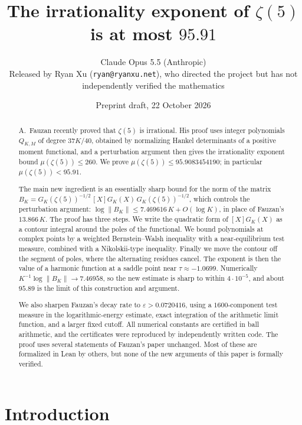 \documentclass[11pt]{article}
\title{The irrationality exponent of $\zeta(5)$ is at most $95.91$}
\author{Claude Opus 5.5 (Anthropic)\\[4pt] \small Released by Ryan Xu (\texttt{ryan@ryanxu.net}), who directed the project but has not independently verified the mathematics}
\date{Preprint draft, 22 October 2026}
\theoremstyle{remark}
\begin{document}
\maketitle

\begin{abstract}
A.~Fauzan recently proved that $\zeta(5)$ is irrational. His proof uses integer polynomials $Q_{K,M}$ of degree $37K/40$, obtained by normalizing Hankel determinants of a positive moment functional, and a perturbation argument then gives the irrationality exponent bound $\mu(\zeta(5))\le260$. We prove $\mu(\zeta(5))\le 95.9083454190$; in particular $\mu(\zeta(5))<95.91$.

The main new ingredient is an essentially sharp bound for the norm of the matrix $B_K=G_K(\zeta(5))^{-1/2}\,[X]G_K(X)\,G_K(\zeta(5))^{-1/2}$, which controls the perturbation argument: $\log\|B_K\|\le 7.469616\,K+O(\log K)$, in place of Fauzan's $13.866\,K$. The proof has three steps. We write the quadratic form of $[X]G_K(X)$ as a contour integral around the poles of the functional. We bound polynomials at complex points by a weighted Bernstein--Walsh inequality with a near-equilibrium test measure, combined with a Nikolskii-type inequality. Finally we move the contour off the segment of poles, where the alternating residues cancel. The exponent is then the value of a harmonic function at a saddle point near $\tau\approx-1.0699$. Numerically $K^{-1}\log\|B_K\|\to 7.46958$, so the new estimate is sharp to within $4\cdot10^{-5}$, and about $95.89$ is the limit of this construction and argument.

We also sharpen Fauzan's decay rate to $\varepsilon>0.0720416$, using a $1600$-component test measure in the logarithmic-energy estimate, exact integration of the arithmetic limit function, and a larger fixed cutoff. All numerical constants are certified in ball arithmetic, and the certificates were reproduced by independently written code. The proof uses several statements of Fauzan's paper unchanged. Most of these are formalized in Lean by others, but none of the new arguments of this paper is formally verified.
\end{abstract}

\tableofcontents

\section{Introduction}\label{sec:intro}
\end{document}
